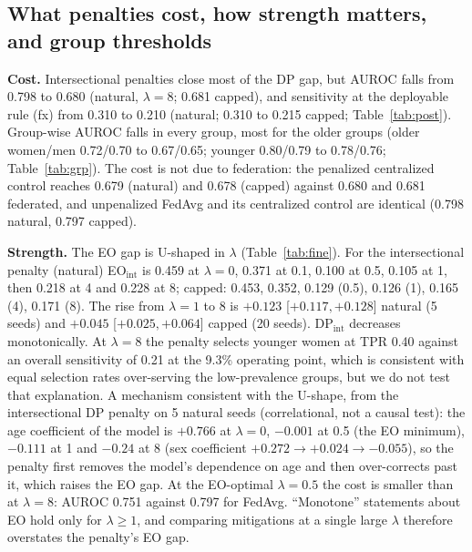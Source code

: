 \subsection{What penalties cost, how strength matters, and group thresholds}
\label{sec:post}
\textbf{Cost.} Intersectional penalties close most of the DP gap, but AUROC falls from 0.798 to 0.680 (natural, $\lambda{=}8$; 0.681 capped), and sensitivity at the deployable rule (fx) from 0.310 to 0.210 (natural; 0.310 to 0.215 capped; Table~\ref{tab:post}). Group-wise AUROC falls in every group, most for the older groups (older women/men 0.72/0.70 to 0.67/0.65; younger 0.80/0.79 to 0.78/0.76; Table~\ref{tab:grp}). The cost is not due to federation: the penalized centralized control reaches 0.679 (natural) and 0.678 (capped) against 0.680 and 0.681 federated, and unpenalized FedAvg and its centralized control are identical (0.798 natural, 0.797 capped).

\textbf{Strength.} The EO gap is U-shaped in $\lambda$ (Table~\ref{tab:fine}). For the intersectional penalty (natural) EO$_\text{int}$ is 0.459 at $\lambda{=}0$, 0.371 at 0.1, 0.100 at 0.5, 0.105 at 1, then 0.218 at 4 and 0.228 at 8; capped: 0.453, 0.352, 0.129 (0.5), 0.126 (1), 0.165 (4), 0.171 (8). The rise from $\lambda{=}1$ to 8 is $+0.123$ [$+0.117,+0.128$] natural (5 seeds) and $+0.045$ [$+0.025,+0.064$] capped (20 seeds). DP$_\text{int}$ decreases monotonically. At $\lambda{=}8$ the penalty selects younger women at TPR 0.40 against an overall sensitivity of 0.21 at the 9.3\% operating point, which is consistent with equal selection rates over-serving the low-prevalence groups, but we do not test that explanation. A mechanism consistent with the U-shape, from the intersectional DP penalty on 5 natural seeds (correlational, not a causal test): the age coefficient of the model is $+0.766$ at $\lambda{=}0$, $-0.001$ at 0.5 (the EO minimum), $-0.111$ at 1 and $-0.24$ at 8 (sex coefficient $+0.272\to+0.024\to-0.055$), so the penalty first removes the model's dependence on age and then over-corrects past it, which raises the EO gap. At the EO-optimal $\lambda{=}0.5$ the cost is smaller than at $\lambda{=}8$: AUROC 0.751 against 0.797 for FedAvg. ``Monotone'' statements about EO hold only for $\lambda\ge1$, and comparing mitigations at a single large $\lambda$ therefore overstates the penalty's EO gap.

